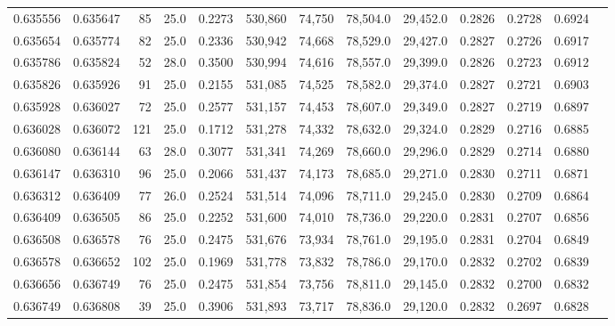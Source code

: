 \begin{tabular}{rrrrrrrrrrrrr}
0.635556 & 0.635647 &    85 & 25.0 &                                     0.2273 & 530,860 &  74,750 &  78,504.0 &  29,452.0 & 0.2826 & 0.2728 & 0.6924 \\
0.635654 & 0.635774 &    82 & 25.0 &                                     0.2336 & 530,942 &  74,668 &  78,529.0 &  29,427.0 & 0.2827 & 0.2726 & 0.6917 \\
0.635786 & 0.635824 &    52 & 28.0 &                                     0.3500 & 530,994 &  74,616 &  78,557.0 &  29,399.0 & 0.2826 & 0.2723 & 0.6912 \\
0.635826 & 0.635926 &    91 & 25.0 &                                     0.2155 & 531,085 &  74,525 &  78,582.0 &  29,374.0 & 0.2827 & 0.2721 & 0.6903 \\
0.635928 & 0.636027 &    72 & 25.0 &                                     0.2577 & 531,157 &  74,453 &  78,607.0 &  29,349.0 & 0.2827 & 0.2719 & 0.6897 \\
0.636028 & 0.636072 &   121 & 25.0 &                                     0.1712 & 531,278 &  74,332 &  78,632.0 &  29,324.0 & 0.2829 & 0.2716 & 0.6885 \\
0.636080 & 0.636144 &    63 & 28.0 &                                     0.3077 & 531,341 &  74,269 &  78,660.0 &  29,296.0 & 0.2829 & 0.2714 & 0.6880 \\
0.636147 & 0.636310 &    96 & 25.0 &                                     0.2066 & 531,437 &  74,173 &  78,685.0 &  29,271.0 & 0.2830 & 0.2711 & 0.6871 \\
0.636312 & 0.636409 &    77 & 26.0 &                                     0.2524 & 531,514 &  74,096 &  78,711.0 &  29,245.0 & 0.2830 & 0.2709 & 0.6864 \\
0.636409 & 0.636505 &    86 & 25.0 &                                     0.2252 & 531,600 &  74,010 &  78,736.0 &  29,220.0 & 0.2831 & 0.2707 & 0.6856 \\
0.636508 & 0.636578 &    76 & 25.0 &                                     0.2475 & 531,676 &  73,934 &  78,761.0 &  29,195.0 & 0.2831 & 0.2704 & 0.6849 \\
0.636578 & 0.636652 &   102 & 25.0 &                                     0.1969 & 531,778 &  73,832 &  78,786.0 &  29,170.0 & 0.2832 & 0.2702 & 0.6839 \\
0.636656 & 0.636749 &    76 & 25.0 &                                     0.2475 & 531,854 &  73,756 &  78,811.0 &  29,145.0 & 0.2832 & 0.2700 & 0.6832 \\
0.636749 & 0.636808 &    39 & 25.0 &                                     0.3906 & 531,893 &  73,717 &  78,836.0 &  29,120.0 & 0.2832 & 0.2697 & 0.6828 \\

\end{tabular}
